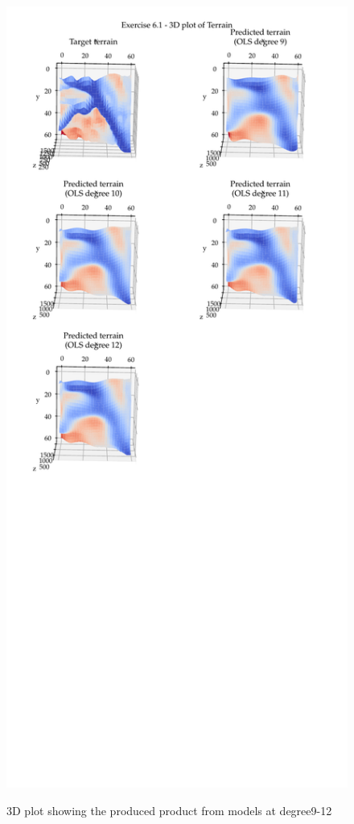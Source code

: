\documentclass[11pt, a4paper]{article}
\begin{document}
\begin{figure}
  \centering
  \caption{3D plot showing the produced product from models at degree9-12}
  \hspace*{-1.2cm}
  \includegraphics[scale=0.95]{figures/EX6_EX1_target_terrain_and_OLS_prediction_3D.pdf}
  \label{fig:EX6_1_OLS_3D}
\end{figure}
\end{document}
